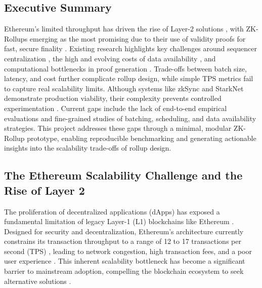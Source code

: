 \vspace{12pt}
\subsection{Executive Summary}
\vspace{12pt}

Ethereum's limited throughput has driven the rise of Layer-2 solutions \cite{sanka2021systematic, habib2025analyzing}, with ZK-Rollups emerging as the most promising due to their use of validity proofs for fast, secure finality \cite{chaliasos2024pricing, chaliasos2024analyzing}. Existing research highlights key challenges around sequencer centralization \cite{motepalli2023sok}, the high and evolving costs of data availability \cite{saif2024survey}, and computational bottlenecks in proof generation \cite{gogol2025scalingdefi, chaliasos2024analyzing}. Trade-offs between batch size, latency, and cost further complicate rollup design, while simple TPS metrics fail to capture real scalability limits. Although systems like zkSync \cite{matterlabs_zksync} and StarkNet \cite{starkware_starknet} demonstrate production viability, their complexity prevents controlled experimentation \cite{motepalli2023sok, saif2024survey, silva2025public}. Current gaps include the lack of end-to-end empirical evaluations and fine-grained studies of batching, scheduling, and data availability strategies. This project addresses these gaps through a minimal, modular ZK-Rollup prototype, enabling reproducible benchmarking and generating actionable insights into the scalability trade-offs of rollup design.

\vspace{12pt}
\subsection{The Ethereum Scalability Challenge and the Rise of Layer 2}

\vspace{12pt}
The proliferation of decentralized applications (dApps) has exposed a fundamental limitation of legacy Layer-1 (L1) blockchains like Ethereum \cite{ethScalingDocs}. Designed for security and decentralization, Ethereum's architecture currently constrains its transaction throughput to a range of 12 to 17 transactions per second (TPS) \cite{habib2025analyzing}, leading to network congestion, high transaction fees, and a poor user experience \cite{habib2025analyzing}. This inherent scalability bottleneck has become a significant barrier to mainstream adoption, compelling the blockchain ecosystem to seek alternative solutions \cite{habib2025analyzing}.\newline

